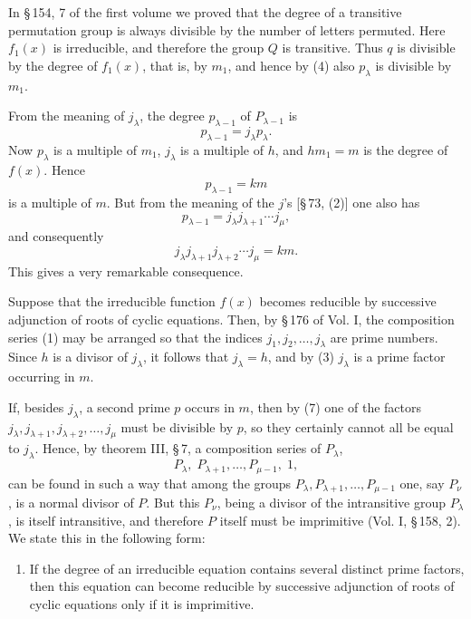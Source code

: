 \documentclass[11pt]{article}
\begin{document}
In \S\,154, 7 of the first volume we proved that the degree of a transitive permutation group is always divisible by the number of letters permuted. Here $f_1(x)$ is irreducible, and therefore the group $Q$ is transitive. Thus $q$ is divisible by the degree of $f_1(x)$, that is, by $m_1$, and hence by (4) also $p_\lambda$ is divisible by $m_1$.

From the meaning of $j_\lambda$, the degree $p_{\lambda-1}$ of $P_{\lambda-1}$ is
\begin{equation}
 p_{\lambda-1}=j_\lambda p_\lambda .
 \tag{5}
\end{equation}
Now $p_\lambda$ is a multiple of $m_1$, $j_\lambda$ is a multiple of $h$, and $hm_1=m$ is the degree of $f(x)$. Hence
\begin{equation}
 p_{\lambda-1}=k m
 \tag{6}
\end{equation}
is a multiple of $m$. But from the meaning of the $j$'s [\S\,73, (2)] one also has
\[
 p_{\lambda-1}=j_\lambda j_{\lambda+1}\cdots j_\mu,
\]
and consequently
\begin{equation}
 j_\lambda j_{\lambda+1}j_{\lambda+2}\cdots j_\mu=km.
 \tag{7}
\end{equation}
This gives a very remarkable consequence.

Suppose that the irreducible function $f(x)$ becomes reducible by successive adjunction of roots of cyclic equations. Then, by \S\,176 of Vol. I, the composition series (1) may be arranged so that the indices $j_1,j_2,\ldots,j_\lambda$ are prime numbers. Since $h$ is a divisor of $j_\lambda$, it follows that $j_\lambda=h$, and by (3) $j_\lambda$ is a prime factor occurring in $m$.

If, besides $j_\lambda$, a second prime $p$ occurs in $m$, then by (7) one of the factors $j_\lambda,j_{\lambda+1},j_{\lambda+2},\ldots,j_\mu$ must be divisible by $p$, so they certainly cannot all be equal to $j_\lambda$. Hence, by theorem III, \S\,7, a composition series of $P_\lambda$,
\begin{equation}
 P_\lambda,\;P_{\lambda+1},\ldots,P_{\mu-1},\;1,
 \tag{8}
\end{equation}
can be found in such a way that among the groups $P_\lambda,P_{\lambda+1},\ldots,P_{\mu-1}$ one, say $P_\nu$, is a normal divisor of $P$. But this $P_\nu$, being a divisor of the intransitive group $P_\lambda$, is itself intransitive, and therefore $P$ itself must be imprimitive (Vol. I, \S\,158, 2). We state this in the following form:

\begin{enumerate}[label=\arabic*.,leftmargin=2.6em]
\item If the degree of an irreducible equation contains several distinct prime factors, then this equation can become reducible by successive adjunction of roots of cyclic equations only if it is imprimitive.
\end{enumerate}
\end{document}

